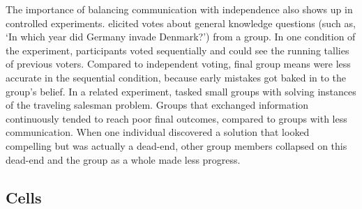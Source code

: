 \documentclass[12pt]{article}
\begin{document}
The importance of balancing communication with independence also shows up in controlled experiments. \cite{frey2021social} elicited votes about general knowledge questions (such as, `In which year did Germany invade Denmark?') from a group. In one condition of the experiment, participants voted sequentially and could see the running tallies of previous voters. Compared to independent voting, final group means were less accurate in the sequential condition, because early mistakes got baked in to the group's belief. In a related experiment, \cite{bernstein2018intermittent} tasked small groups with solving instances of the traveling salesman problem. Groups that exchanged information continuously tended to reach poor final outcomes, compared to groups with less communication. When one individual discovered a solution that looked compelling but was actually a dead-end, other group members collapsed on this dead-end and the group as a whole made less progress.



\subsection{Cells}
\end{document}
